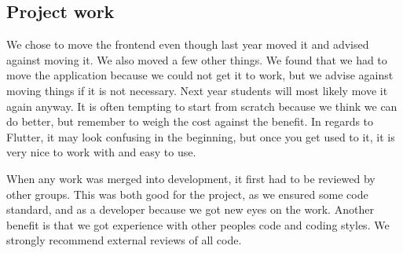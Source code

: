 \subsection{Project work}
We chose to move the frontend even though last year moved it and advised against moving it. We also moved a few other things. We found that we had to move the application because we could not get it to work, but we advise against moving things if it is not necessary. Next year students will most likely move it again anyway. It is often tempting to start from scratch because we think we can do better, but remember to weigh the cost against the benefit. In regards to Flutter, it may look confusing in the beginning, but once you get used to it, it is very nice to work with and easy to use.

When any work was merged into development, it first had to be reviewed by other groups. This was both good for the project, as we ensured some code standard, and as a developer because we got new eyes on the work. Another benefit is that we got experience with other peoples code and coding styles. We strongly recommend external reviews of all code.
